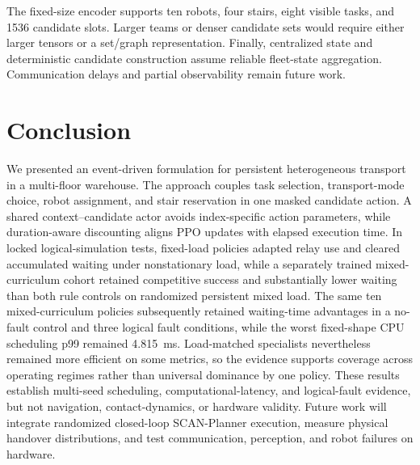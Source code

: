 \documentclass[journal]{IEEEtran}
\begin{document}
The fixed-size encoder supports ten robots, four stairs, eight visible tasks, and 1536 candidate slots. Larger teams or denser candidate sets would require either larger tensors or a set/graph representation. Finally, centralized state and deterministic candidate construction assume reliable fleet-state aggregation. Communication delays and partial observability remain future work.

\section{Conclusion}
\label{sec:conclusion}

We presented an event-driven formulation for persistent heterogeneous transport in a multi-floor warehouse. The approach couples task selection, transport-mode choice, robot assignment, and stair reservation in one masked candidate action. A shared context--candidate actor avoids index-specific action parameters, while duration-aware discounting aligns PPO updates with elapsed execution time. In locked logical-simulation tests, fixed-load policies adapted relay use and cleared accumulated waiting under nonstationary load, while a separately trained mixed-curriculum cohort retained competitive success and substantially lower waiting than both rule controls on randomized persistent mixed load. The same ten mixed-curriculum policies subsequently retained waiting-time advantages in a no-fault control and three logical fault conditions, while the worst fixed-shape CPU scheduling p99 remained 4.815~ms. Load-matched specialists nevertheless remained more efficient on some metrics, so the evidence supports coverage across operating regimes rather than universal dominance by one policy. These results establish multi-seed scheduling, computational-latency, and logical-fault evidence, but not navigation, contact-dynamics, or hardware validity. Future work will integrate randomized closed-loop SCAN-Planner execution, measure physical handover distributions, and test communication, perception, and robot failures on hardware.

\FloatBarrier



\end{document}
